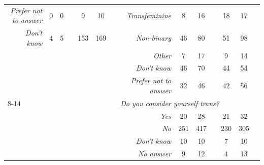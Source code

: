 \begin{table}[htpb]
{\begin{tabular}{lcclccl|rcclccl}
\multicolumn{1}{r}{\textit{Prefer not to answer}} & 0 & 0 &  & 9 & 10 &  & \textit{Transfeminine}              & 8 & 16 &  & 18 & 17 &  \\
\multicolumn{1}{r}{\textit{Don't know}}           & 4 & 5 &  & 153 & 169 &  & \textit{Non-binary}                 & 46 & 80 &  & 51 & 98 &  \\
                                                  & \multicolumn{1}{l}{} & \multicolumn{1}{l}{} &  & \multicolumn{1}{l}{} & \multicolumn{1}{l}{} &  & \textit{Other}                      & 7 & 17 &  & 9 & 14 &  \\
                                                  & \multicolumn{1}{l}{} & \multicolumn{1}{l}{} &  & \multicolumn{1}{l}{} & \multicolumn{1}{l}{} &  & \textit{Don't know}                 & 46 & 70 &  & 44 & 54 &  \\
                                                  & \multicolumn{1}{l}{} & \multicolumn{1}{l}{} &  & \multicolumn{1}{l}{} & \multicolumn{1}{l}{} &  & \textit{Prefer not to answer}       & 32 & 46 &  & 42 & 56 &  \\ \cline{8-14} 
                                                  & \multicolumn{1}{l}{} & \multicolumn{1}{l}{} &  & \multicolumn{1}{l}{} & \multicolumn{1}{l}{} &  & \multicolumn{6}{l}{\textit{Do you consider yourself trans?}}                                                                                                                                                                                                                                                                                                  &  \\
                                                  & \multicolumn{1}{l}{} & \multicolumn{1}{l}{} &  & \multicolumn{1}{l}{} & \multicolumn{1}{l}{} &  & \textit{Yes}                        & 20 & 28 &  & 21 & 32 &  \\
                                                  & \multicolumn{1}{l}{} & \multicolumn{1}{l}{} &  & \multicolumn{1}{l}{} & \multicolumn{1}{l}{} &  & \textit{No}                         & 251 & 417 &  & 230 & 305 &  \\
                                                  & \multicolumn{1}{l}{} & \multicolumn{1}{l}{} &  & \multicolumn{1}{l}{} & \multicolumn{1}{l}{} &  & \textit{Don't know}                 & 10 & 10 &  & 7 & 10 &  \\
                                                  & \multicolumn{1}{l}{} & \multicolumn{1}{l}{} &  & \multicolumn{1}{l}{} & \multicolumn{1}{l}{} &  & \textit{No answer}                  & 9 & 12 &  & 4 & 13 &  \\ \hline

\end{tabular}}
\end{table}
